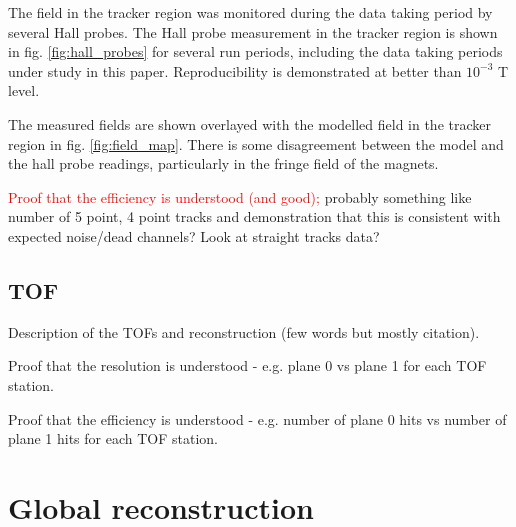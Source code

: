 The field in the tracker region was monitored during the data taking period by
several Hall probes. The Hall probe measurement in the tracker region is shown
in fig. \ref{fig:hall_probes} for several run periods, including the data taking
periods under study in this paper. Reproducibility is demonstrated at better than
$10^{-3}$ T level.

The measured fields are shown overlayed with the modelled field in the tracker 
region in fig. \ref{fig:field_map}. There is some disagreement between the model
and the hall probe readings, particularly in the fringe field of the magnets.

\textcolor{red}{Proof that the efficiency is understood (and good);} probably something like 
number of 5 point, 4 point tracks and demonstration that this is consistent with
expected noise/dead channels? Look at straight tracks data?

\subsection{TOF}

Description of the TOFs and reconstruction (few words but mostly citation).

Proof that the resolution is understood - e.g. plane 0 vs plane 1 for each TOF station.

Proof that the efficiency is understood - e.g. number of plane 0 hits vs number 
of plane 1 hits for each TOF station.

\section{Global reconstruction}


